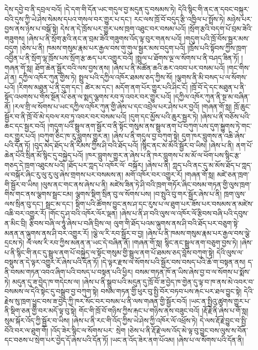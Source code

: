 དེས་དབྱེ་བ་ནི་དབྲལ་བའོ། །དེ་དག་གི་དོན་ཡང་གདུལ་བྱ་མདུན་དུ་བསམས་ཏེ། དེའི་སྙིང་གི་ནང་ན་དབང་བསྐུར་བའི་དུས་ཀྱི་ཡེ་ཤེས་སེམས་དཔའ་གསལ་བར་གྱུར་པ་དང་། རང་ལས་ཁྲོ་བོ་བདུད་རྩི་འཁྱིལ་པ་སྤྲོས་ཏེ། མཉེས་པར་བྱས་ནས་ཉེས་པ་བསྒོ་སྟེ། དེས་ན་དེ་ཁྲོས་པར་གྱུར་པས་ཁྲག་འཐུང་བར་བསམ་པའོ། །སྲོག་རྩའི་བདག་པོ་བྲམ་ཟེའི་གཟུགས། །ཞེས་པ་ནི་སྲོག་རྩའི་ནང་ན་བྲམ་ཟེའི་གཟུགས་འོད་ལྟ་བུར་གནས་པའོ། །གདུག་པའི་ཁྲོ་བོས་སྦྱར་མས་བདུག །ཅེས་པ་ནི། ཁམས་གསུམ་རྣམ་པར་རྒྱལ་བས་གུ་གུལ་སྦྱར་མས་བདུག་པའོ། །ཁྲོས་པའི་སྟོབས་ཀྱིས་ཁྲག་འབྱིན་པ་ནི་སྲོག་ལྷ་ཁྲོས་པས་སྲོག་རྩ་ཆད་པར་འགྱུར་བའོ། །སྤྲུལ་པ་ཐོགས་ལྔ་ལ་སོགས་པ་ནི་བཤད་ཟིན་ཏོ། །གཞན་གོ་སླ། ཐོག་ཆེན་སྦྱོར་བའི་ལས་བྱས་ནས། །ཞེས་པ་ནི་མཚོན་ཆའི་ཆར་འབབ་པར་བསམ་པའོ། །གང་གིས་ཤེ་ན། དཀྱིལ་འཁོར་ཀུན་གྱིས་ཏེ། སྤྲུལ་པའི་དཀྱིལ་འཁོར་ཐམས་ཅད་ཀྱིས་སོ། །ལྕགས་ནི་མི་བསད་པ་ལ་སོགས་པའོ། །རིགས་མཐུན་པ་ནི་དུག་དང་། ཚེར་མ་དང་། མདོག་ནག་པོར་གྱུར་པའི་ཤིང་ངོ། །ཁྲོ་བོ་དེ་དང་མཐུན་པ་ནི་སྟོད་འཕགས་པ་གོས་སྔོན་པོ་ཅན་ལ་སྨད་ལྕགས་རབ་ཏུ་འབར་བར་གྱུར་པའོ། །དཀྱིལ་འཁོར་ཀུན་ནི་སྔ་མ་བཞིན་ནོ། །རལ་གྲི་ལ་སོགས་པ་ཡང་དཀྱིལ་འཁོར་ཀུན་གྱི་ཞེས་པ་དང་འབྲེལ་པར་ཤེས་པར་བྱའོ། །གཞན་གོ་སླ། ཁྲོ་ཆུང་སྦྱོར་བ་ནི་ཁྲོ་བོ་མེ་དབལ་རབ་ཏུ་འབར་བར་བསམ་པའོ། །དུག་དང་མྱོས་པའི་ཆུར་སྦྱར་ཏེ། །ཞེས་པ་ནི་བཅོས་པའི་ཆང་དང་སྦྱར་བའོ། །གདུག་པའི་སྦྲུལ་ནག་སྦྱོར་བ་ནི་སྟོང་གསུམ་ནས་སྦྲུལ་ནག་པོ་བཀུག་པས་དུག་སྐྱུགས་ཏེ་གང་བར་གྱུར་པའོ། །བཀུག་ཅིང་ཁ་རུ་བླུགས་གྱུར་ན། །ཞེས་པ་ནི་གདུལ་བྱ་བཀུག་སྟེ། དུག་ཁར་བླུགས་ན་འཆི་ཞེས་པའི་དོན་ཏོ། །བུད་མེད་ཐོད་པ་ནི་རིམས་ཀྱིས་ཤི་བའི་ཐོད་པའོ། །སྙིང་ནང་མ་མོའི་སྦྱོར་བ་ཡིས། །ཞེས་པ་ནི། ནག་པོ་ཆེན་པོའི་སྲིན་མོ་སྙིང་དུ་བསྐྱེད་པའོ། །ཁར་བླུགས་གྱུར་ན་ཞེས་པ་ནི་ཁར་བླུགས་པ་མ་མོ་ལ་ཕོག་པས་སྙིང་རྩ་གཅད་དེ་ཁྲག་འཐུངས་པའོ། །ཐོད་པར་ཀླད་པ་འཁོར་ལོ་​ བསྐོར། །ཞེས་པ་ནི། ཀླད་པའི་ནང་དུ་མ་མོས་ཐོད་པ་ཀླད་ལ་བསྐོར་ཞིང་རུ་ལུ་རུ་ལུ་ཞེས་གྲགས་པར་བསམས་ན། མགོ་འཁོར་བར་འགྱུར་རོ། །གཞན་གོ་སླ། མཛེ་ཅན་ཁྲག་གི་སྦྱོར་བ་ཡིས། །ལུས་ནང་གང་ནས་ཞེས་པ་ནི། མཛེས་ཟིན་ཏེ་ཤི་བའི་ཁྲག་གཏོར་ཞིང་བསམ་གཏན་གྱི་ལུས་ཁྲག་གིས་གང་ནས་ལྕགས་སྦྲང་ངམ། ལྕགས་སྡིག་སྲིན་བུ་ལ་སོགས་པས། །བ་སྤུའི་བུ་གར་སྦྱོར་ཞེས་པ་ནི། ཁྲག་ལུས་ལས་སྲིན་བུ་དང་། སྦྲང་མ་དང་། སྡིག་པའི་ཚོགས་བྱུང་ནས་ཤ་དང་རུས་པ་ལ་ཐུག་པར་ཟོས་པར་བསམས་ན་མཛེས་འཆི་བར་འགྱུར་རོ། །གོང་དུ་ཤ་བའི་འཁོར་ལོར་ལྡན། །ཞེས་པ་ནི་ཤ་བའི་ལུས་ལ་འཁོར་ལོ་རྩིབས་བཞི་པའི་དབུས་ན་མིང་བྲི། རྩིབས་བཞི་ལ་ཧཱུཾ་ཞེས་པ་བཞི་བྲིས་ལ། ལུག་གི་ཐོད་པའམ་ལྐུགས་ནས་ཤི་བའི་ཐོད་པར་བཅུག་སྟེ་མནན་ན་ལྐུགས་ནས་ཤི་བར་འགྱུར་རོ། །ལྕེ་ལ་རི་རབ་སྦྱོར་བ་བྱ། །ཞེས་པ་ནི་ཁམས་གསུམ་རྣམ་པར་རྒྱལ་བས་ལྕེ་དྲངས་ཏེ། ལཾ་ལས་རི་རབ་ཀྱིས་མནན་ན་ཡང་དེ་བཞིན་ནོ། །གཞན་གོ་སླ། སྙིང་ནང་སྦྲུལ་ནག་བཅུག་བྱས་ཏེ། །ཞེས་པ་ནི་སྙིང་གི་ནང་དུ་སྦྲུལ་ནག་པོ་བསྐྱེད་ལ་སྟོང་གསུམ་གྱི་སྦྲུལ་ནག་པོ་ཐམས་ཅད་བློས་བཀུག་སྟེ། དེའི་ལུས་ལ་བསྡུས་ན་དེ་ལྟར་འགྱུར་རོ་ཞེས་པའི་དོན་ཏོ། །དེ་ལྟར་རྫས་ལ་སོགས་པའི་སྦྱོར་བས་བསད་པའི་ཆོ་ག་བསྟན་ནས། ད་ནི་བསམ་གཏན་འབའ་ཞིག་པའི་བསད་པ་བསྟན་པའི་ཕྱིར། བསམ་གཏན་ཁོ་ན་ཡིས་ཞེས་བྱ་བ་ལ་སོགས་པ་སྨོས་ཏེ། མདུན་དུ་ཟ་བྱེད་ཁ་གདེངས་ལ། །ཞེས་པ་ནི་སྒྲུབ་པའི་མདུན་དུ་ཁྲོ་བོ་ཟ་བྱེད་ཁ་གྱེན་དུ་ལྟ་བ་ཁ་ནས་མེ་འབར་བ་བསམས་ལ་དེའི་སྟེང་དུ་བསྒྲུབ་བྱ་བཀུག་སྟེ། བསམ་གཏན་གྱི་ཕུར་བུ་སྤྱི་བོར་བཏབ་པས་རྐང་པར་ཐལ་བྱུང་སྟེ། དེའི་རྗེས་སུ་ཁྲག་ཕྱུང་བས་ཟ་བྱེད་ཀྱི་ཁར་སོང་བར་བསམ་པ་ནི་ལས་གཞན་གྱི་སྦྱོར་བའོ། །ཡང་ན་སྤྱིའུ་ཚུགས་གྱུར་པ་ནི་སྡིག་ཅན་གྱི་བར་མདོ་ལྟ་བུ་སྟེ། གོང་གི་ཁྲོ་བོ་གཉིས་ཀྱིས་རྐང་པ་གཉིས་ནས་བཟུང་བའོ། །རྡོ་རྗེ་ནི་ཞེས་པ་གོ་སླ། སུམ་སྐོར་འོད་ཀྱི་སྦྱོར་བ་ཡིས། །ཞེས་པ་ནི་རང་གི་འོད་ཀྱིས་ཡེ་ཤེས་ཀྱི་འཁོར་ལོ་འཕྲོས་ཏེ། དེ་ལས་རྡོ་རྗེ་བྱུང་བ་སྤྱི་བོའི་བར་ལ་ཐུག་གོ། །འོད་ཟེར་སྙིང་ལ་སོགས་པར་​ སྲེག །ཅེས་པ་ནི་རྡོ་རྗེ་ལས་འོད་མེ་ལྟ་བུ་བྱུང་བས་ལུས་ས་བོན་དང་བཅས་པ་སྲེག་པར་བྱེད་དོ་ཞེས་པའི་དོན་ཏོ། །ཡང་ན་འོད་ཟེར་ནག་པོའམ། །ཞེས་པ་ལ་སོགས་པའི་དོན་ནི། 